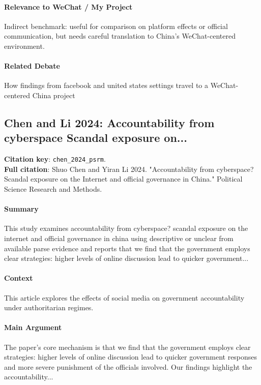 \documentclass[12pt]{article}
\begin{document}
\paragraph{Relevance to WeChat / My Project} Indirect benchmark: useful for comparison on platform effects or official communication, but needs careful translation to China's WeChat-centered environment.

\paragraph{Related Debate} How findings from facebook and united states settings travel to a WeChat-centered China project


\subsection{Chen and Li 2024: Accountability from cyberspace Scandal exposure on...}
\textbf{Citation key}: \texttt{chen\_2024\_psrm}.\\
\textbf{Full citation}: Shuo Chen and Yiran Li 2024. "Accountability from cyberspace? Scandal exposure on the Internet and official governance in China." Political Science Research and Methods.

\paragraph{Summary} This study examines accountability from cyberspace? scandal exposure on the internet and official governance in china using descriptive or unclear from available parse evidence and reports that we find that the government employs clear strategies: higher levels of online discussion lead to quicker government...

\paragraph{Context} This article explores the effects of social media on government accountability under authoritarian regimes.

\paragraph{Main Argument} The paper's core mechanism is that we find that the government employs clear strategies: higher levels of online discussion lead to quicker government responses and more severe punishment of the officials involved. Our findings highlight the accountability...
\end{document}
